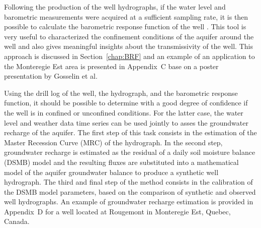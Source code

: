 \documentclass[WHATMANUAL.tex]{subfiles}
\begin{document}
Following the production of the well hydrographs, if the water level and barometric measurements were acquired at a sufficient sampling rate, it is then possible to calculate the barometric response function of the well \citep{butler_jr._new_2011,rasmussen_identifying_1997,spane_considering_2002}. This tool is very useful to characterized the confinement conditions of the aquifer around the well and also gives meaningful insights about the transmissivity of the well. This approach is discussed in Section~\ref{chap:BRF} and an example of an application to the Monteregie Est area is presented in Appendix~C base on a poster presentation by Gosselin et al.

Using the drill log of the well, the hydrograph, and the barometric response function, it should be possible to determine with a good degree of confidence if the well is in confined or unconfined conditions. For the latter case, the water level and weather data time series can be used jointly to asses the groundwater recharge of the aquifer. The first step of this task consists in the estimation of the Master Recession Curve (MRC) of the hydrograph. In the second step, groundwater recharge is estimated as the residual of a daily soil moisture balance (DSMB) model and the resulting fluxes are substituted into a mathematical model of the aquifer groundwater balance to produce a synthetic well hydrograph. The third and final step of the method consists in the calibration of the DSMB model parameters, based on the comparison of synthetic and observed well hydrographs. An example of groundwater recharge estimation is provided in Appendix~D for a well located at Rougemont in Monteregie Est, Quebec, Canada.
\end{document}
